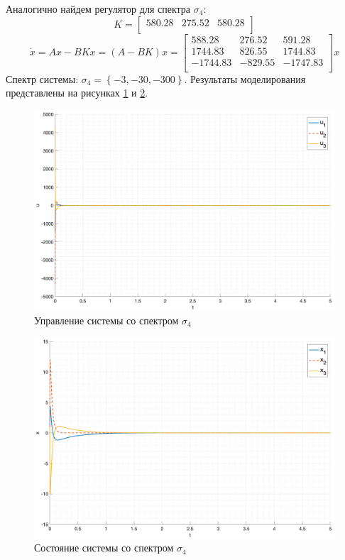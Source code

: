 Аналогично найдем регулятор для спектра $\sigma_4$:
\begin{equation}
    K = \begin{bmatrix}
        580.28  & 275.52  & 580.28 \\ 
    \end{bmatrix}
\end{equation}
\begin{equation}
    \dot{x} = Ax - BKx = (A - BK)x = \begin{bmatrix}
        588.28  & 276.52  & 591.28 \\ 
        1744.83  & 826.55  & 1744.83 \\ 
        -1744.83  & -829.55  & -1747.83 \\ 
    \end{bmatrix}x
\end{equation}
Спектр системы: $\sigma_4 = \left\{ -3, -30, -300 \right\}$.
Результаты моделирования представлены на рисунках \ref{fig:task1_u_4} и \ref{fig:task1_x_4}.
\begin{figure}[ht!]
    \centering
    \includegraphics[width=\textwidth]{media/plots/task1_u_4.png}
    \caption{Управление системы со спектром $\sigma_4$}
    \label{fig:task1_u_4}
\end{figure}
\begin{figure}
    \centering
    \includegraphics[width=\textwidth]{media/plots/task1_x_4.png}
    \caption{Состояние системы со спектром $\sigma_4$}
    \label{fig:task1_x_4}
\end{figure}

